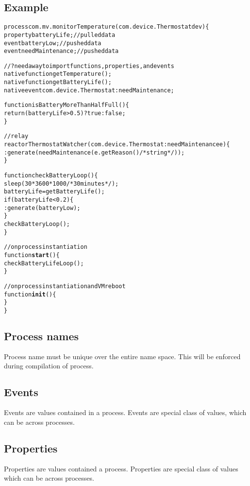 \documentclass{note}\usepackage{mathptm,mydef}
\begin{document}
\subsection{Example}
\begin{alltt}
  \textcolor{red2}{process com.mv.monitorTemperature(com.device.Thermostat dev) \{
    property batteryLife;    // pulled data
    event batteryLow;        // pushed data
    event needMaintenance;   // pushed data
   
    // ? need a way to import functions, properties, and events
    native function getTemperature();
    native function getBatteryLife();
    native event com.device.Thermostat:needMaintenance;

    function isBatteryMoreThanHalfFull() \{
      return (batteryLife > 0.5) ? true : false;
    \}

    // relay
    reactor ThermostatWatcher(com.device.Thermostat:needMaintenance e) \{
      :generate(needMaintenance(e.getReason() /* string */));
    \}

    function checkBatteryLoop() \{ 
      sleep(30*3600*1000 /* 30 minutes */);
      batteryLife = getBatteryLife();
      if (batteryLife < 0.2) \{
        :generate(batteryLow);
      \}
      checkBatteryLoop();
    \}

    // on process instantiation
    function \textbf{start}() \{
      checkBatteryLifeLoop();
    \}

    // on process instantiation and VM reboot
    function \textbf{init}() \{
    \}
  \}}
\end{alltt}

\subsection{Process names}
Process name must be unique over the entire name space. This will be
enforced during compilation of process.

\subsection{Events}
Events are values contained in a process.
Events are special class of values, which can be  across 
processes.

\subsection{Properties}
Properties are values contained a process.
Properties are special class of values which can be  across
processes. 
\end{document}
